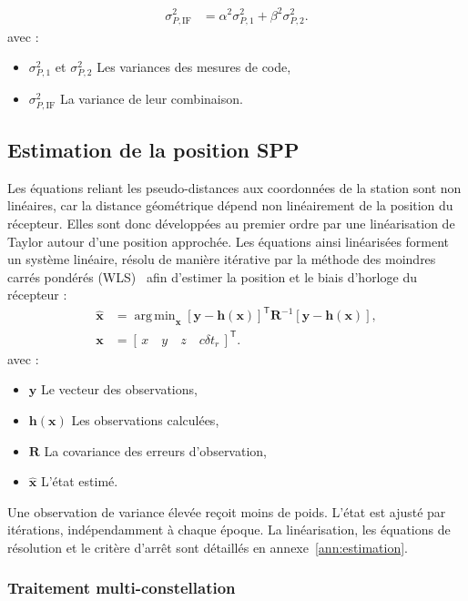 \begin{align}
\sigma_{P,\mathrm{IF}}^2&=\alpha^2\sigma_{P,1}^2+\beta^2\sigma_{P,2}^2.
\label{new:if_variance}
\end{align}
avec :
\begin{itemize}
\item $\sigma_{P,1}^2$ et $\sigma_{P,2}^2$ Les variances des mesures de code,
\item $\sigma_{P,\mathrm{IF}}^2$ La variance de leur combinaison.
\end{itemize}

\subsection{Estimation de la position SPP}

Les équations reliant les pseudo-distances aux coordonnées de la station sont
non linéaires, car la distance géométrique dépend non linéairement de la
position du récepteur. Elles sont donc développées au premier ordre par une
linéarisation de Taylor autour d'une position approchée. Les équations ainsi
linéarisées forment un système linéaire, résolu de manière itérative par la
méthode des moindres carrés pondérés (WLS)~\cite{verhagen2017least} afin
d'estimer la position et le biais d'horloge du récepteur :
\begin{align}
\widehat{\mathbf x}
&=\mathop{\mathrm{arg\,min}}_{\mathbf x}
[\mathbf y-\mathbf h(\mathbf x)]^{\mathsf T}\mathbf R^{-1}
[\mathbf y-\mathbf h(\mathbf x)],\\
\mathbf x&=[\,x\quad y\quad z\quad c\delta t_r\,]^{\mathsf T}.
\label{new:wls}
\end{align}
avec :
\begin{itemize}
\item $\mathbf y$ Le vecteur des observations,
\item $\mathbf h(\mathbf x)$ Les observations calculées,
\item $\mathbf R$ La covariance des erreurs d'observation,
\item $\widehat{\mathbf x}$ L'état estimé.
\end{itemize}

Une observation de variance élevée reçoit moins de poids. L'état est ajusté
par itérations, indépendamment à chaque époque. La linéarisation, les
équations de résolution et le critère d'arrêt sont détaillés en
annexe~\ref{ann:estimation}.

\subsubsection{Traitement multi-constellation}

